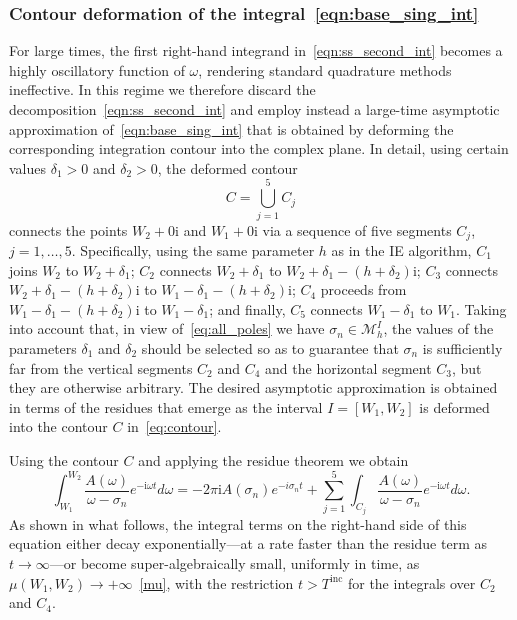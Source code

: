 \documentclass[11pt]{article}
\theoremstyle{plain}
\theoremstyle{remark}
\begin{document}
\subsubsection{Contour deformation of the integral~\eqref{eqn:base_sing_int}}\label{sec:cont_def}
For large times, the first right-hand integrand
in~\eqref{eqn:ss_second_int} becomes a highly oscillatory function of
$\omega$, rendering standard quadrature methods ineffective. In this
regime we therefore discard the
decomposition~\eqref{eqn:ss_second_int} and  employ instead a
large-time asymptotic approximation of~\eqref{eqn:base_sing_int} that
is obtained by deforming the corresponding integration contour into
the complex plane. In detail, using certain values $\delta_1 >0$ and
$\delta_2 > 0$, the deformed contour
\begin{equation}
  \label{eq:contour}
 C  = \bigcup_{j=1}^5 C_j
\end{equation}
connects the points $W_2 + 0\mathrm{i}$ and $W_1 + 0\mathrm{i}$ via a
sequence of five segments $C_j$, $j = 1, \dots, 5$. Specifically,
using the same parameter $h$ as in the IE algorithm, $C_1$ joins $W_2$
to $W_2 + \delta_1$; $C_2$ connects $W_2 + \delta_1$ to
$W_2 + \delta_1 - (h + \delta_2)\mathrm{i}$; $C_3$ connects
$W_2 + \delta_1 -(h + \delta_2)\mathrm{i}$ to
$W_1 - \delta_1 - (h + \delta_2)\mathrm{i}$; $C_4$ proceeds from
$W_1 - \delta_1 - (h + \delta_2)\mathrm{i}$ to $W_1 - \delta_1$; and
finally, $C_5$ connects $W_1 - \delta_1$ to $W_1$.  Taking into
account that, in view of~\eqref{eq:all_poles} we have
$\sigma_n \in \mathcal{M}^I_h$, the values of the parameters $\delta_1$
and $\delta_2$ should be selected so as to guarantee that $\sigma_n$ is
sufficiently far from the vertical segments $C_2$ and $C_4$ and the
horizontal segment $C_3$, but they are otherwise arbitrary. The
desired asymptotic approximation is obtained in terms of the residues
that emerge as the interval $I = [W_1,W_2]$ is deformed into the
contour $C$ in~\eqref{eq:contour}.

Using the contour $C$ and applying the residue theorem we obtain
\begin{equation}\label{eqn:base_sing_int_cont}
  \int_{W_1}^{W_2} \frac{A(\omega)}{\omega - \sigma_n}e^{-\mathrm{i}\omega t}d\omega = -2\pi\mathrm{i} A(\sigma_n)e^{-i\sigma_nt} + \sum_{j=1}^5\int_{C_j} \frac{A(\omega)}{\omega - \sigma_n}e^{-\mathrm{i}\omega t}d\omega.
\end{equation}
As shown in what follows, the integral terms on the right-hand side of
this equation either decay exponentially---at a rate faster than the
residue term as $t \to \infty$---or become super-algebraically small,
uniformly in time, as $\mu(W_1,W_2) \to +\infty$~\eqref{mu}, with the
restriction $t > T^\mathrm{inc}$ for the integrals over $C_2$ and
$C_4$.
\end{document}
